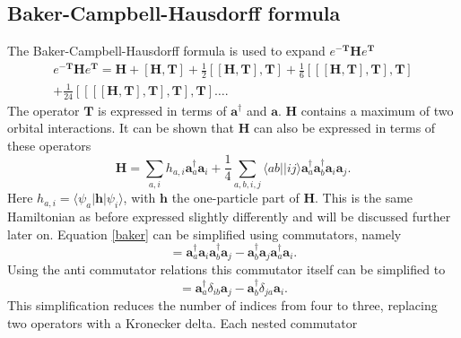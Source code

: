 \documentclass[a4paper,norsk,11pt,twoside]{report}
\begin{document}
\subsection{Baker-Campbell-Hausdorff formula}
The Baker-Campbell-Hausdorff formula is used to expand $e^{-\textbf{T}} \textbf{H} e^{\textbf{T}}$
\begin{equation}
\begin{split}
e^{-\textbf{T}} \textbf{H} e^{\textbf{T}} = 
\textbf{H} 
+ \left[ \textbf{H}, \textbf{T} \right] 
+ \frac{1}{2} \left[ [\textbf{H}, \textbf{T}], \textbf{T} \right]  + \frac{1}{6} \left[ [ [\textbf{H}, \textbf{T}], \textbf{T}], \textbf{T} \right] \\
+ \frac{1}{24} \left[ [ [ [\textbf{H}, \textbf{T}], \textbf{T}],\textbf{T}], \textbf{T} \right] \dots .
\end{split} \label{baker}
\end{equation}
The operator $\textbf{T}$ is expressed in terms of $\textbf{a}^{\dag}$
and $\textbf{a}$. $\textbf{H}$ contains a maximum of two orbital
interactions. It can be shown that $\textbf{H}$ can also be expressed
in terms of these operators
\begin{equation}
\textbf{H} = \sum_{a,i} h_{a,i}
\textbf{a}^{\dag}_a 
\textbf{a}_i 
+ \frac{1}{4} \sum_{a,b,i,j} \langle ab||ij \rangle
\textbf{a}^{\dag}_a  
\textbf{a}^{\dag}_b
\textbf{a}_i 
\textbf{a}_j . \label{annih}
\end{equation}
Here $h_{a,i} = \langle \psi_a | \textbf{h} | \psi_i \rangle$, with
$\textbf{h}$ the one-particle part of $\textbf{H}$. This is the same
Hamiltonian as before expressed slightly differently and will be
discussed further later on. Equation \eqref{baker} can be simplified using
commutators, namely
\begin{equation}
[\textbf{a}^{\dag}_a  \textbf{a}_i 
, \textbf{a}^{\dag}_b \textbf{a}_j] =
\textbf{a}^{\dag}_a  \textbf{a}_i \textbf{a}^{\dag}_b \textbf{a}_j
- \textbf{a}^{\dag}_b \textbf{a}_j \textbf{a}^{\dag}_a  \textbf{a}_i .
\end{equation} 
Using the anti commutator relations this commutator itself can be simplified to
\begin{equation}
[\textbf{a}^{\dag}_a  \textbf{a}_i 
, \textbf{a}^{\dag}_b \textbf{a}_j] =
\textbf{a}^{\dag}_a  \delta_{ib} \textbf{a}_j
- \textbf{a}^{\dag}_b \delta_{ja} \textbf{a}_i .
\end{equation}
This simplification reduces the number of indices from four to three,
replacing two operators with a Kronecker delta. Each nested commutator
\end{document}
